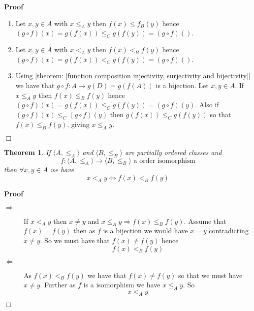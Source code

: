 \documentclass{book}
\newenvironment{proof}{\noindent\textbf{Proof\ }}{\hspace*{\fill}$\Box$\medskip}
\newtheorem{theorem}{Theorem}
\begin{document}
\begin{proof}
  
  \begin{enumerate}
    \item Let $x, y \in A$ with $x \leqslant_A y$ then $f (x) \leqslant f_B
    (y)$ hence $(g \circ f) (x) = g (f (x)) \leqslant_C g (f (y)) = (g \circ
    f) ()$.
    
    \item Let $x, y \in A$ with $x <_A y$ then $f (x) <_B f (y)$ hence $(g
    \circ f) (x) = g (f (x)) <_C g (f (y)) = (g \circ f) ()$.
    
    \item Using [theorem: \ref{function composition injectivity, surjectivity
    and bijectivity}] we have that $g \circ f : A \rightarrow g (D) = g (f
    (A))$ is a bijection. Let $x, y \in A$. If $x \leqslant_A y$ then $f (x)
    \leqslant_B f (y)$ hence $(g \circ f) (x) = g (f (x)) \leqslant_C g (f
    (y)) = (g \circ f) (y)$. Also if $(g \circ f) (x) \leqslant_C (g \circ f)
    (y)$ then $g (f (x)) \leqslant_C g (f (y))$ so that $f (x) \leqslant_B f
    (y)$, giving $x \leqslant_A y$.
  \end{enumerate}
\end{proof}

\begin{theorem}
  \label{order isomorphism strictly}If $\langle A, \leqslant_A \rangle$ and
  $\langle B, \leqslant_B \rangle$ are partially ordered classes and
  \[ f : \langle A, \leqslant_A \rangle \rightarrow \langle B, \leqslant_B
     \rangle \text{ a order isomorphism} \]
  then $\forall x, y \in A$ we have
  \[ x <_A y \Leftrightarrow f (x) <_B f (y) \]
\end{theorem}

\begin{proof}
  
  \begin{description}
    \item[$\Rightarrow$] If $x <_A y$ then $x \neq y$ and $x \leqslant_A y
    \Rightarrow f (x) \leqslant_B f (y)$. Assume that $f (x) = f (y)$ then as
    $f$ is a bijection we would have $x = y$ contradicting $x \neq y$. So we
    must have that $f (x) \neq f (y)$ hence
    \[ f (x) <_B f (y) \]
    \item[$\Leftarrow$] As $f (x) <_B f (y)$ we have that $f (x) \neq f (y)$
    so that we must have $x \neq y$. Further as $f$ is a isomorphism we have
    $x \leqslant_A y$. So
    \[ x <_A y \]
  \end{description}
\end{proof}
\end{document}

